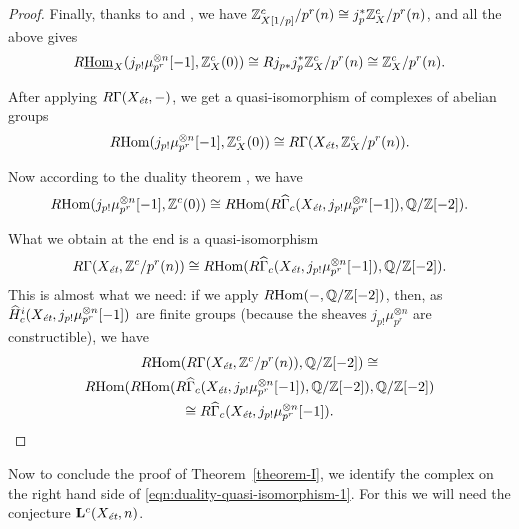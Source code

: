 \documentclass{article}
\numberwithin{equation}{section}
\begin{document}
\begin{proposition}
\begin{proof}
    Finally, thanks to \cite[Theorem~7.2~(a)]{Geisser-2010} and
    \cite[Proposition~2.3]{Geisser-2010}, we have
    $\ZZ^c_{X [1/p]}/p^r (n) \cong j_p^*\ZZ^c_X/p^r (n)$, and all the above
    gives
    \begin{equation}
      R\iHom_X (j_{p!} \mu_{p^r}^{\otimes n} [-1], \ZZ^c_X (0)) \cong
      R j_{p*} j_p^* \ZZ^c_X/p^r (n) \cong \ZZ^c_X/p^r (n).
    \end{equation}

    After applying $R\Gamma (X_\et, -)$, we get a quasi-isomorphism of
    complexes of abelian groups
    \begin{equation}
      \RHom (j_{p!} \mu_{p^r}^{\otimes n} [-1], \ZZ^c_X (0)) \cong
      R\Gamma (X_\et, \ZZ^c_X/p^r (n)).
    \end{equation}

    Now according to the duality theorem \cite[Theorem 7.8]{Geisser-2010},
    we have
    \begin{equation}
      \RHom (j_{p !} \mu_{p^r}^{\otimes n} [-1], \ZZ^c (0)) \cong
      \RHom (R\widehat{\Gamma}_c (X_\et, j_{p !} \mu_{p^r}^{\otimes n} [-1]), \QQ/\ZZ [-2]).
    \end{equation}

    What we obtain at the end is a quasi-isomorphism
    \[ R\Gamma (X_\et, \ZZ^c/p^r (n)) \cong
    \RHom (R\widehat{\Gamma}_c (X_\et, j_{p !} \mu_{p^r}^{\otimes n} [-1]), \QQ/\ZZ [-2]). \]
    This is almost what we need: if we apply $\RHom (-,\QQ/\ZZ [-2])$, then, as
    $\widehat{H}^i_c (X_\et, j_{p!} \mu_{p^r}^{\otimes n} [-1])$ are
    finite groups (because the sheaves $j_{p!} \mu_{p^r}^{\otimes n}$ are
    constructible), we have
    \begin{multline*}
      \RHom (R\Gamma (X_\et, \ZZ^c/p^r (n)), \QQ/\ZZ[-2]) \cong\\
      \RHom (\RHom (R\widehat{\Gamma}_c (X_\et, j_{p !} \mu_{p^r}^{\otimes n} [-1]), \QQ/\ZZ[-2]), \QQ/\ZZ[-2]) \\
      \cong R\widehat{\Gamma}_c (X_\et, j_{p !} \mu_{p^r}^{\otimes n} [-1]). \qedhere
    \end{multline*}
  \end{proof}
\end{proposition}

Now to conclude the proof of Theorem~\ref{theorem-I}, we identify the complex
on the right hand side of \eqref{eqn:duality-quasi-isomorphism-1}. For this we
will need the conjecture $\mathbf{L}^c (X_\et, n)$.
\end{document}
